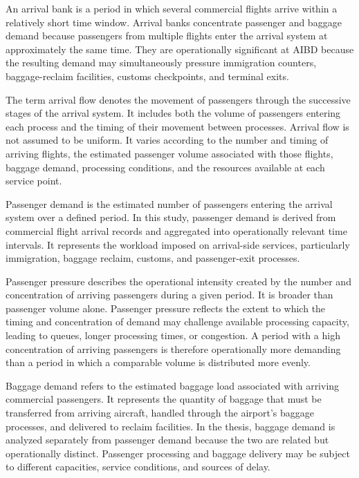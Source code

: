 An arrival bank is a period in which several commercial flights arrive within a relatively short time window. Arrival banks concentrate passenger and baggage demand because passengers from multiple flights enter the arrival system at approximately the same time. They are operationally significant at AIBD because the resulting demand may simultaneously pressure immigration counters, baggage-reclaim facilities, customs checkpoints, and terminal exits.

The term arrival flow denotes the movement of passengers through the successive stages of the arrival system. It includes both the volume of passengers entering each process and the timing of their movement between processes. Arrival flow is not assumed to be uniform. It varies according to the number and timing of arriving flights, the estimated passenger volume associated with those flights, baggage demand, processing conditions, and the resources available at each service point.

Passenger demand is the estimated number of passengers entering the arrival system over a defined period. In this study, passenger demand is derived from commercial flight arrival records and aggregated into operationally relevant time intervals. It represents the workload imposed on arrival-side services, particularly immigration, baggage reclaim, customs, and passenger-exit processes.

Passenger pressure describes the operational intensity created by the number and concentration of arriving passengers during a given period. It is broader than passenger volume alone. Passenger pressure reflects the extent to which the timing and concentration of demand may challenge available processing capacity, leading to queues, longer processing times, or congestion. A period with a high concentration of arriving passengers is therefore operationally more demanding than a period in which a comparable volume is distributed more evenly.

Baggage demand refers to the estimated baggage load associated with arriving commercial passengers. It represents the quantity of baggage that must be transferred from arriving aircraft, handled through the airport's baggage processes, and delivered to reclaim facilities. In the thesis, baggage demand is analyzed separately from passenger demand because the two are related but operationally distinct. Passenger processing and baggage delivery may be subject to different capacities, service conditions, and sources of delay.

